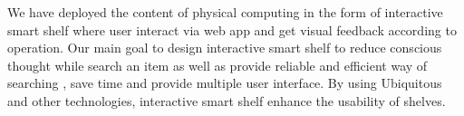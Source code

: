 We have deployed the content of physical computing in the form of interactive smart shelf where user interact via web app and get visual feedback according to operation. Our main goal to design interactive smart shelf to reduce conscious thought while search an item as well as provide  reliable and efficient way of searching , save time and provide multiple user interface. By using Ubiquitous and other technologies, interactive smart shelf enhance the usability of shelves.